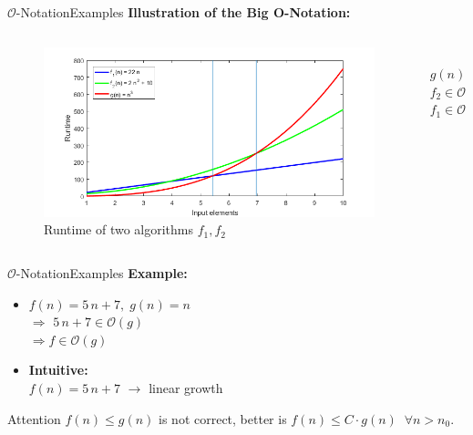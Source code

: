 \begin{frame}{$\mathcal{O}$-Notation}{Examples}
  \textbf{Illustration of the Big O-Notation:}\\[-1.0em]
  \begin{columns}
    \begin{column}{0.9\textwidth}
      \begin{figure}[!h]
        \includegraphics[width=\linewidth]{Images/BigONotationRuntime.png}
        \caption{Runtime of two algorithms $f_1, f_2$}
        \label{fig:big_o_runtime_example}
      \end{figure}
    \end{column}
    \begin{column}{0.1\textwidth}
      \vspace{-4.75em}\\
      \hspace*{-2.5em}$g(n)$\\[2.0em]
      \hspace*{-2.5em}$f_2 \in \mathcal{O}(g)$\\[2.5em]
      \hspace*{-2.5em}$f_1 \in \mathcal{O}(g)$
    \end{column}
  \end{columns}
\end{frame}


\begin{frame}{$\mathcal{O}$-Notation}{Examples}
  \textbf{Example:}
  \begin{itemize}
    \item
      $f(n) = 5 \, n + 7, \; g(n) = n$\\
      $\Rightarrow$ $5 \, n + 7 \in \mathcal{O}(g)$\\
      $\Rightarrow f \in \mathcal{O}(g)$
     \item
      \textbf{Intuitive:}\\
      $f(n) = 5 \, n + 7$ $\rightarrow$ linear growth
  \end{itemize}
  \begin{alertblock}{Attention}
    $f(n) \leq g(n)$ is not correct, better is
    $f(n) \leq C \cdot g(n) \;\; \forall n > n_0$.
  \end{alertblock}
\end{frame}

